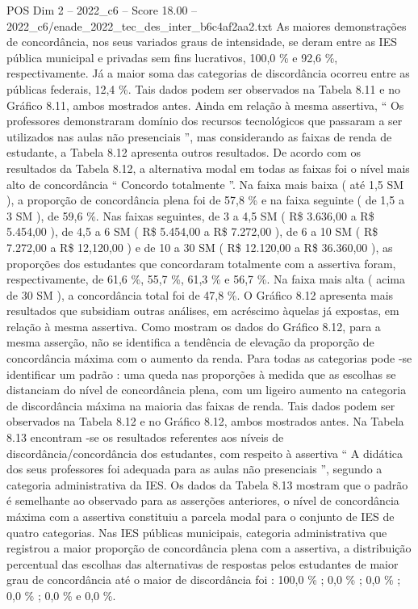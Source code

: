 \begin{textsample}{POS Dim 2 – 2022\_c6 – Score 18.00 – 2022\_c6/enade\_2022\_tec\_des\_inter\_b6c4af2aa2.txt}
As maiores demonstrações de concordância, nos seus variados graus de intensidade, se deram entre as IES pública municipal e privadas sem fins lucrativos, 100,0 \% e 92,6 \%, respectivamente.
Já a maior soma das categorias de discordância ocorreu entre as públicas federais, 12,4 \%.
Tais dados podem ser observados na Tabela 8.11 e no Gráfico 8.11, ambos mostrados antes.
Ainda em relação à mesma assertiva, “ Os professores demonstraram domínio dos recursos tecnológicos que passaram a ser utilizados nas aulas não presenciais ”, mas considerando as faixas de renda de estudante, a Tabela 8.12 apresenta outros resultados.
De acordo com os resultados da Tabela 8.12, a alternativa modal em todas as faixas foi o nível mais alto de concordância “ Concordo totalmente ”.
Na faixa mais baixa ( até 1,5 SM ), a proporção de concordância plena foi de 57,8 \% e na faixa seguinte ( de 1,5 a 3 SM ), de 59,6 \%.
Nas faixas seguintes, de 3 a 4,5 SM ( R\$ 3.636,00 a R\$ 5.454,00 ), de 4,5 a 6 SM ( R\$ 5.454,00 a R\$ 7.272,00 ), de 6 a 10 SM ( R\$ 7.272,00 a R\$ 12,120,00 ) e de 10 a 30 SM ( R\$ 12.120,00 a R\$ 36.360,00 ), as proporções dos estudantes que concordaram totalmente com a assertiva foram, respectivamente, de 61,6 \%, 55,7 \%, 61,3 \% e 56,7 \%.
Na faixa mais alta ( acima de 30 SM ), a concordância total foi de 47,8 \%.
O Gráfico 8.12 apresenta mais resultados que subsidiam outras análises, em acréscimo àquelas já expostas, em relação à mesma assertiva.
Como mostram os dados do Gráfico 8.12, para a mesma asserção, não se identifica a tendência de elevação da proporção de concordância máxima com o aumento da renda.
Para todas as categorias pode -se identificar um padrão : uma queda nas proporções à medida que as escolhas se distanciam do nível de concordância plena, com um ligeiro aumento na categoria de discordância máxima na maioria das faixas de renda.
Tais dados podem ser observados na Tabela 8.12 e no Gráfico 8.12, ambos mostrados antes.
Na Tabela 8.13 encontram -se os resultados referentes aos níveis de discordância/concordância dos estudantes, com respeito à assertiva “ A didática dos seus professores foi adequada para as aulas não presenciais ”, segundo a categoria administrativa da IES.
Os dados da Tabela 8.13 mostram que o padrão é semelhante ao observado para as asserções anteriores, o nível de concordância máxima com a assertiva constituiu a parcela modal para o conjunto de IES de quatro categorias.
Nas IES públicas municipais, categoria administrativa que registrou a maior proporção de concordância plena com a assertiva, a distribuição percentual das escolhas das alternativas de respostas pelos estudantes de maior grau de concordância até o maior de discordância foi : 100,0 \% ; 0,0 \% ; 0,0 \% ; 0,0 \% ; 0,0 \% e 0,0 \%.

\end{textsample}
